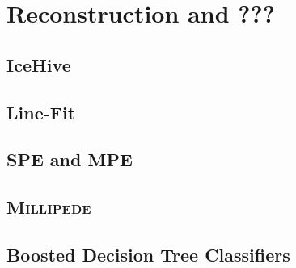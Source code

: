\chapter{Reconstruction and ???}
\section{IceHive}
\section{Line-Fit}
\section{SPE and MPE}
\section{\textsc{Millipede}}
\section{Boosted Decision Tree Classifiers}